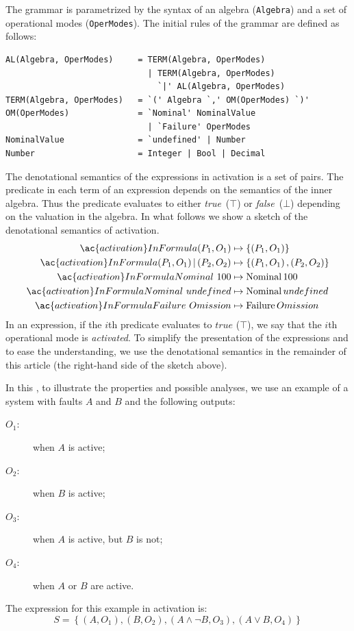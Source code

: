 \documentclass[12pt,openright,twoside,a4paper,oldfontcommands,english,brazil,final]{abntex2}
\theoremstyle{theo}
\def\undefinednominal{\ensuremath undefined}
\newcommand{\Nominal}[1]{\ensuremath\mathop{\mathrm{Nominal}} #1}
\newcommand{\Failure}[1]{\ensuremath\mathop{\mathrm{Failure}} #1}
\begin{document}
The grammar is parametrized by the syntax of an algebra (\verb|Algebra|) and a set of operational modes (\verb|OperModes|).
The initial rules of the grammar are defined as follows:
\begin{verbatim}
AL(Algebra, OperModes)     = TERM(Algebra, OperModes) 
                             | TERM(Algebra, OperModes) 
                               `|' AL(Algebra, OperModes)
TERM(Algebra, OperModes)   = `(' Algebra `,' OM(OperModes) `)'
OM(OperModes)              = `Nominal' NominalValue 
                             | `Failure' OperModes
NominalValue               = `undefined' | Number
Number                     = Integer | Bool | Decimal
\end{verbatim}
%
The denotational semantics of the expressions in \ac{activation} is a set of pairs.
The predicate in each term of an expression depends on the semantics of the inner algebra.
Thus the predicate evaluates to either \emph{true}~($\top$) or \emph{false}~($\bot$) depending on the valuation in the algebra.
In what follows we show a sketch of the denotational semantics of \ac{activation}.
%
\begin{align*}
  \ac{activation}InFormula{\left(P_1, O_1\right)} &\mapsto \{\left(P_1, O_1\right)\}\\
  \ac{activation}InFormula{\left(P_1, O_1\right) | \left(P_2, O_2\right)} &\mapsto
    \{\left(P_1, O_1\right), \left(P_2, O_2\right)\}\\
  \ac{activation}InFormula{Nominal~100} &\mapsto \Nominal{100}\\
  \ac{activation}InFormula{Nominal~undefined} &\mapsto \Nominal{\undefinednominal}\\
  \ac{activation}InFormula{Failure~Omission} &\mapsto \Failure{Omission}
\end{align*}
%
In an expression, if the $i$th predicate evaluates to $true$ ($\top$), we say that the $i$th operational mode is \emph{activated}.
To simplify the presentation of the expressions and to ease the understanding, we use the denotational semantics in the remainder of this article (the right-hand side of the sketch above).


In this , to illustrate the properties and possible analyses, we use an example of a system with faults $A$ and $B$ and the following outputs:
\begin{description}
  \item[$O_1$:] when $A$ is active;
  \item[$O_2$:] when $B$ is active;
  \item[$O_3$:] when $A$ is active, but $B$ is not;
  \item[$O_4$:] when $A$ or $B$ are active.
\end{description}
%
The expression for this example in \ac{activation} is:
\begin{equation}
S = \left\{\left(A, O_1\right), \left(B, O_2\right), \left(A \land \lnot B, O_3\right), \left(A \lor B, O_4\right)\right\}
\end{equation}
\end{document}

